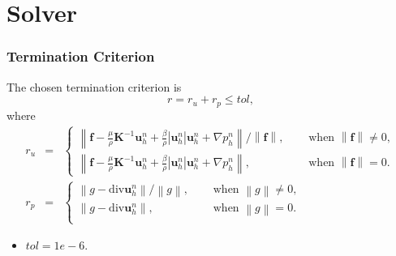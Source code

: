 \documentclass[notheorems,serif]{beamer}
\begin{document}
\section{Solver}
\begin{frame}
\frametitle{Termination Criterion}
The chosen termination criterion is $$ r = r_{u} + r_{p} \leq tol ,$$ 
where 
\begin{eqnarray*}
r_{u} &= &\begin{cases}
 \left\| \boldsymbol{f} - \frac{\mu }{\rho }{\boldsymbol{K}^{ - 1}}\boldsymbol{u}_h^n + \frac{\beta }{\rho }\left| \boldsymbol{u}_h^n \right|\boldsymbol{u}_h^n + \nabla p_h^n \right\|/\left\| \boldsymbol{f} \right\|, &\quad\text{ when } \left\|\boldsymbol{f} \right\| \neq 0,\\
 \left\|\boldsymbol{f} - \frac{\mu }{\rho }{\boldsymbol{K}^{ - 1}}\boldsymbol{u}_h^n + \frac{\beta }{\rho }\left| \boldsymbol{u}_h^n \right|\boldsymbol{u}_h^n + \nabla p_h^n \right\|, &\quad\text{ when } \left\| \boldsymbol{f} \right\| = 0.
 \end{cases}\\
   r_{p} &=&\begin{cases} 
  \left\| g - \text{div}\boldsymbol{u}_h^n \right\|/\left\| g \right\|, &\quad\text{ when } \left\| g \right\|\neq 0,\\
  \left\| g - \text{div}\boldsymbol{u}_h^n \right\|, &\quad\text{ when } \left\| g \right\| = 0.\\
\end{cases} 
\end{eqnarray*}
\begin{itemize}
\item $tol = 1e-6.$
\end{itemize}
\end{frame}
\end{document}
